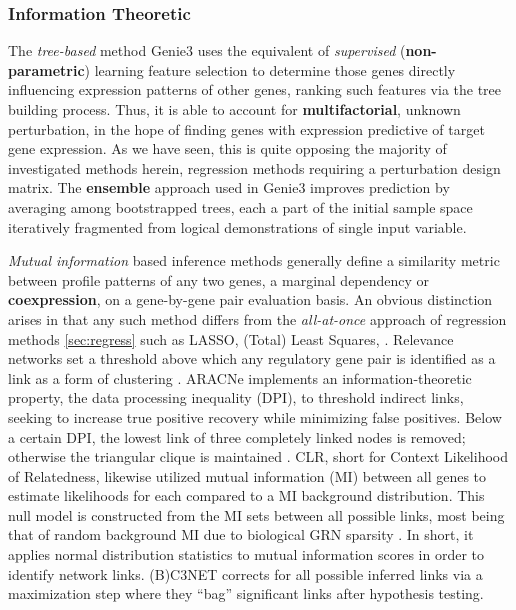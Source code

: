 \subsubsection{Information Theoretic}
\label{sec:info}
The \emph{tree-based} method Genie3 \citep{irrthum2010inferring} uses the equivalent of \emph{supervised} (\textbf{non-parametric}) learning feature selection to determine those genes directly influencing expression patterns of other genes, ranking such features via the tree building process. Thus, it is able to account for \textbf{multifactorial}, \ie unknown perturbation, in the hope of finding genes with expression predictive of target gene expression. As we have seen, this is quite opposing the majority of investigated methods herein, regression methods requiring a perturbation design matrix. The \textbf{ensemble} approach used in Genie3 improves prediction by averaging among bootstrapped trees, each a part of the initial sample space iteratively fragmented from logical demonstrations of single input variable.

\emph{Mutual information} based inference methods generally define a similarity metric between profile patterns of any two genes, a marginal dependency or \textbf{coexpression}, on a gene-by-gene pair evaluation basis. An obvious distinction arises in that any such method differs from the {\it all-at-once} approach of regression methods \cref{sec:regress} such as LASSO, (Total) Least Squares, \etc. Relevance networks set a threshold above which any regulatory gene pair is identified as a link as a form of clustering \citep{faith2007large}. ARACNe implements an information-theoretic property, the data processing inequality (DPI), to threshold indirect links, seeking to increase true positive recovery while minimizing false positives. Below a certain DPI, the lowest link of three completely linked nodes is removed; otherwise the triangular clique is maintained \citep{montes2014aracne}. CLR, short for Context Likelihood of Relatedness, likewise utilized mutual information (MI) between all genes to estimate likelihoods for each compared to a MI background distribution. This null model is constructed from the MI sets between all possible links, most being that of random background MI due to biological GRN sparsity \citep{faith2007large}. In short, it applies normal distribution statistics to mutual information scores in order to identify network links. (B)C3NET \citep{altay2010inferring,de2012bagging} corrects for all possible inferred links via a maximization step where they ``bag'' significant links after hypothesis testing.

